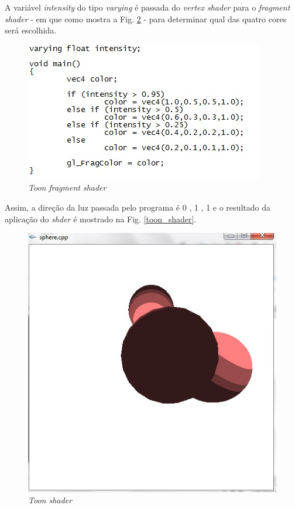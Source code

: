 \begin{description}
	A variável \textit{intensity} do tipo \textit{varying} é passada do \textit{vertex shader} para o \textit{fragment shader} - em que como mostra a  Fig. \ref{toon_fs} - para determinar qual das quatro cores será escolhida. 
  
	\begin{figure}[h]
	\centering
		\includegraphics[keepaspectratio=true,scale=0.8]{figuras/toon_fs.jpg}
	\caption{\textit{Toon fragment shader}}
	\label{toon_fs}
	\end{figure}

	Assim, a direção da luz passada pelo programa é {0 , 1 , 1} e o resultado da aplicação do \textit{shder} é mostrado na  Fig. \ref{toon_shader}.

	\begin{figure}[h]
	\centering
		\includegraphics[keepaspectratio=true,scale=0.55]{figuras/toon_shader.jpg}
	\caption{\textit{Toon shader}}
	\label{toon_fs}
	\end{figure}


\end{description}
